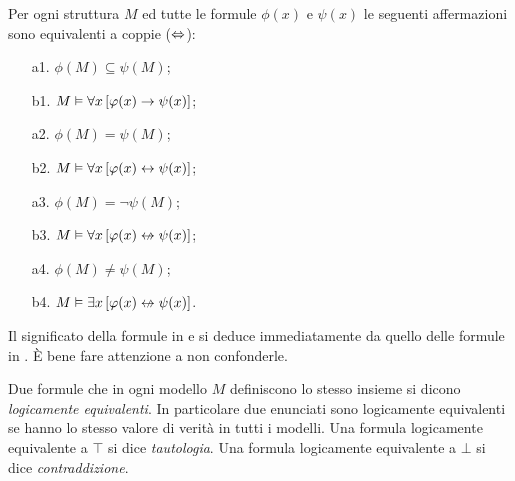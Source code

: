 \begin{proposition} Per ogni struttura $M$ ed tutte le formule $\phi(x)$ e $\psi(x)$ le seguenti affermazioni sono equivalenti a coppie ($\Leftrightarrow$):
\par\medskip
\begin{minipage}[b]{.50\textwidth}
\begin{itemize}
\item[a1.] $\phi(M)\subseteq\psi(M)$;
\item[b1.] $M\vDash\forall x\,[\varphi(x)\rightarrow\psi(x)]$;
\end{itemize}
\end{minipage}
%
\begin{minipage}[b]{.49\textwidth}
\begin{itemize}
\item[a2.] $\phi(M)=\psi(M)$;
\item[b2.] $M\vDash\forall x\,[\varphi(x)\leftrightarrow\psi(x)]$;
\end{itemize}
\end{minipage}
\par\bigskip
\begin{minipage}[b]{.50\textwidth}
\begin{itemize}
\item[a3.] $\phi(M)=\neg\psi(M)$;
\item[b3.] $M\models\A x\,[\phi(x)\niff\psi(x)]$;
\end{itemize}
\end{minipage}
%
\begin{minipage}[b]{.49\textwidth}
\begin{itemize}
\item[a4.] $\phi(M)\neq\psi(M)$;
\item[b4.] $M\models\E x\,[\phi(x)\niff\psi(x)]$.
\end{itemize}
\end{minipage}\QED
\end{proposition}

Il significato della formule in  e  si deduce immediatamente da quello delle formule in . \`E bene fare attenzione a non confonderle.

\begin{definition}
Due formule che in ogni modello $M$ definiscono lo stesso insieme si dicono \emph{logicamente equivalenti}. In particolare due enunciati  sono logicamente equivalenti se hanno lo stesso valore di verit\`a in tutti i modelli. Una formula logicamente equivalente a $\top$ si dice \emph{tautologia}. Una formula logicamente equivalente a $\bot$ si dice \emph{contraddizione}.\QED
\end{definition}

